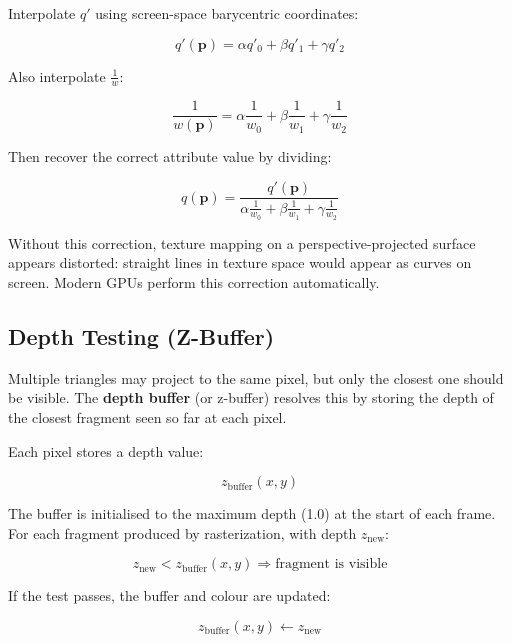 \documentclass[11pt]{article}
\begin{document}
Interpolate $q'$ using screen-space barycentric coordinates:

\begin{equation}
    q'(\mathbf{p}) = \alpha q'_0 + \beta q'_1 + \gamma q'_2
\end{equation}

Also interpolate $\frac{1}{w}$:

\begin{equation}
    \frac{1}{w(\mathbf{p})} = \alpha \frac{1}{w_0} + \beta \frac{1}{w_1} + \gamma \frac{1}{w_2}
\end{equation}

Then recover the correct attribute value by dividing:

\begin{equation}
    q(\mathbf{p}) =
    \frac{q'(\mathbf{p})}{\alpha \frac{1}{w_0} + \beta \frac{1}{w_1} + \gamma \frac{1}{w_2}}
\end{equation}

Without this correction, texture mapping on a perspective-projected surface appears distorted: straight lines in texture space would appear as curves on screen. Modern GPUs perform this correction automatically.

\subsection{Depth Testing (Z-Buffer)}

Multiple triangles may project to the same pixel, but only the closest one should be visible. The \textbf{depth buffer} (or z-buffer) resolves this by storing the depth of the closest fragment seen so far at each pixel.

Each pixel stores a depth value:

\begin{equation}
    z_{\text{buffer}}(x,y)
\end{equation}

The buffer is initialised to the maximum depth (1.0) at the start of each frame. For each fragment produced by rasterization, with depth $z_{\text{new}}$:

\begin{equation}
    z_{\text{new}} < z_{\text{buffer}}(x,y)
    \Rightarrow
    \text{fragment is visible}
\end{equation}

If the test passes, the buffer and colour are updated:

\begin{equation}
    z_{\text{buffer}}(x,y) \leftarrow z_{\text{new}}
\end{equation}
\end{document}
